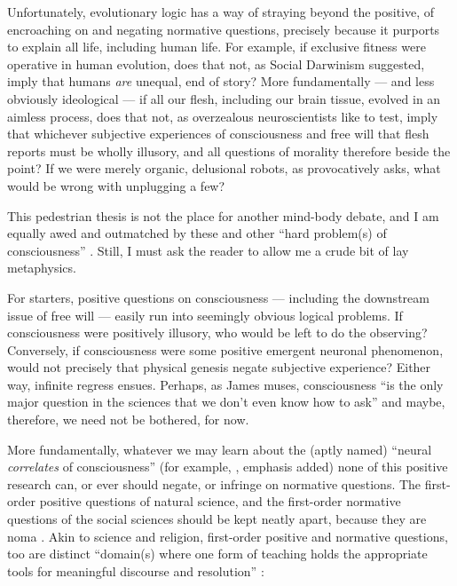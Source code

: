 Unfortunately, evolutionary logic has a way of straying beyond the positive, of encroaching on and negating normative questions, precisely because it purports to explain all life, including human life.
For example, if exclusive fitness were operative in human evolution, does that not, as Social Darwinism suggested, imply that humans \emph{are} unequal, end of story?
More fundamentally --- and less obviously ideological --- if all our flesh, including our brain tissue, evolved in an aimless process, does that not, as overzealous neuroscientists like to test, imply that whichever subjective experiences of consciousness and free will that flesh reports must be wholly illusory, and all questions of morality therefore beside the point?
If we were merely organic, delusional robots, as \citet[Chapter 23]{Wright2000} provocatively asks, what would be wrong with unplugging a few?

This pedestrian thesis is not the place for another mind-body debate, and I am equally awed and outmatched by these and other ``hard problem(s) of consciousness''  \citep{Chalmers1995}.
Still, I must ask the reader to allow me a crude bit of lay metaphysics.

For starters, positive questions on consciousness --- including the downstream issue of free will --- easily run into seemingly obvious logical problems.
If consciousness were positively illusory, who would be left to do the observing?
Conversely, if consciousness were some positive emergent neuronal phenomenon, would not precisely that physical genesis negate subjective experience?
Either way, infinite regress ensues.
Perhaps, as James \citeauthor{Trefil1997} muses, consciousness ``is the only major question in the sciences that we don't even know how to ask'' \citeyearpar[15]{Trefil1997} and maybe, therefore, we need not be bothered, for now.

More fundamentally, whatever we may learn about the (aptly named) ``neural \emph{correlates} of consciousness'' (for example, \citealt{Koch2004}, emphasis added) none of this positive research can, or ever should negate, or infringe on normative questions.
The first-order positive questions of natural science, and the first-order normative questions of the social sciences should be kept neatly apart, because they are \gls{noma} \citep{Gould1997}.
Akin to science and religion, first-order positive and normative questions, too are distinct ``domain(s) where one form of teaching holds the appropriate tools for meaningful discourse and resolution'' \citep[3]{Gould2002}:

